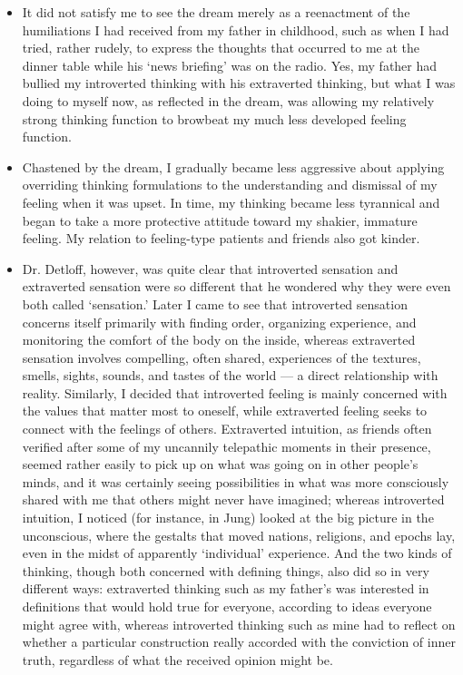 \begin{itemize}
\item It did not satisfy me to see the dream merely as a reenactment of the
humiliations I had received from my father in childhood, such as when I had
tried, rather rudely, to express the thoughts that occurred to me at the dinner
table while his `news briefing' was on the radio. Yes, my father had bullied my
introverted thinking with his extraverted thinking, but what I was doing to
myself now, as reflected in the dream, was allowing my relatively strong
thinking function to browbeat my much less developed feeling function.

\item Chastened by the dream, I gradually became less aggressive about applying
overriding thinking formulations to the understanding and dismissal of my
feeling when it was upset. In time, my thinking became less tyrannical and
began to take a more protective attitude toward my shakier, immature feeling.
My relation to feeling-type patients and friends also got kinder.

\item Dr. Detloff, however, was quite clear that introverted sensation and
extraverted sensation were so different that he wondered why they were even
both called `sensation.' Later I came to see that introverted sensation
concerns itself primarily with finding order, organizing experience, and
monitoring the comfort of the body on the inside, whereas extraverted sensation
involves compelling, often shared, experiences of the textures, smells, sights,
sounds, and tastes of the world --- a direct relationship with reality.
Similarly, I decided that introverted feeling is mainly concerned with the
values that matter most to oneself, while extraverted feeling seeks to connect
with the feelings of others. Extraverted intuition, as friends often verified
after some of my uncannily telepathic moments in their presence, seemed rather
easily to pick up on what was going on in other people's minds, and it was
certainly seeing possibilities in what was more consciously shared with me that
others might never have imagined; whereas introverted intuition, I noticed (for
instance, in Jung) looked at the big picture in the unconscious, where the
gestalts that moved nations, religions, and epochs lay, even in the midst of
apparently `individual' experience. And the two kinds of thinking, though both
concerned with defining things, also did so in very different ways: extraverted
thinking such as my father's was interested in definitions that would hold true
for everyone, according to ideas everyone might agree with, whereas introverted
thinking such as mine had to reflect on whether a particular construction
really accorded with the conviction of inner truth, regardless of what the
received opinion might be.


\end{itemize}
